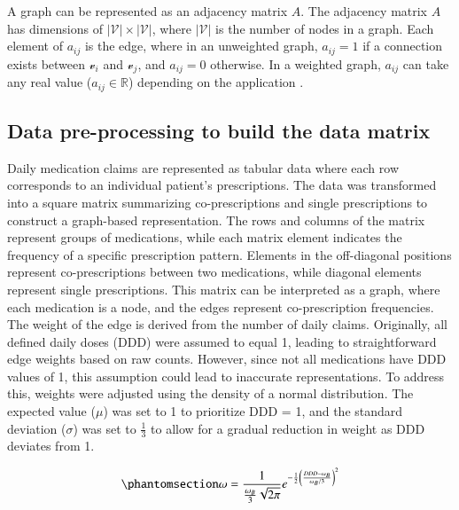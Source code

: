 \documentclass[
  authoryear,
  review]{elsarticle}
\begin{document}
A graph can be represented as an adjacency matrix \(A\). The adjacency
matrix \(A\) has dimensions of \(|\mathcal{V}| \times |\mathcal{V}|\),
where \(|\mathcal{V}|\) is the number of nodes in a graph. Each element
of \(a_{ij}\) is the edge, where in an unweighted graph, \(a_{ij} = 1\)
if a connection exists between \(\mathcal{v}_i\) and \(\mathcal{v}_j\),
and \(a_{ij} = 0\) otherwise. In a weighted graph, \(a_{ij}\) can take
any real value (\(a_{ij} \in \mathbb{R}\)) depending on the application
\citep{estrada2012structure}.

\subsection{Data pre-processing to build the data
matrix}\label{data-pre-processing-to-build-the-data-matrix}

Daily medication claims are represented as tabular data where each row
corresponds to an individual patient's prescriptions. The data was
transformed into a square matrix summarizing co-prescriptions and single
prescriptions to construct a graph-based representation. The rows and
columns of the matrix represent groups of medications, while each matrix
element indicates the frequency of a specific prescription pattern.
Elements in the off-diagonal positions represent co-prescriptions
between two medications, while diagonal elements represent single
prescriptions. This matrix can be interpreted as a graph, where each
medication is a node, and the edges represent co-prescription
frequencies. The weight of the edge is derived from the number of daily
claims. Originally, all defined daily doses (DDD) were assumed to equal
1, leading to straightforward edge weights based on raw counts. However,
since not all medications have DDD values of 1, this assumption could
lead to inaccurate representations. To address this, weights were
adjusted using the density of a normal distribution. The expected value
(\(\mu\)) was set to 1 to prioritize DDD = 1, and the standard deviation
(\(\sigma\)) was set to \(\frac{1}{3}\) to allow for a gradual reduction
in weight as DDD deviates from 1.

\begin{equation}\phantomsection\label{eq-weighted-DDD}{\omega = \frac{1}{\frac{\omega_B}{3} \sqrt{2 \pi}} e^{-\frac{1}{2}\left(\frac{DDD - \omega_B}{\omega_B/3}\right)^2}}\end{equation}
\end{document}
